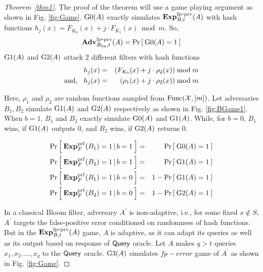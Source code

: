 \begin{proof}[Theorem~\ref{thm1}]
The proof of the theorem will use a game playing argument as shown in Fig. \ref{fig:Game}. $\text{G0}(A)$ exactly simulates $\mathrm{\mathbf{Exp}}^{\mathrm{fp\mbox{-}prv}}_{B,t}(A)$ with hash functions $h_j(x) =  F_{K_0}(x) + j\cdot F_{K_1}(x) \bmod m$. So,
\begin{equation}
\mathrm{\mathbf{Adv}}^{\mathrm{fp\mbox{-}prv}}_{B_{\mathrm{lin}},t}(A) = \Pr\left[\: \text{G0}(A)=1 \:\right]\label{eq:0}
\end{equation}
 $\text{G1}(A)$ and $\text{G2}(A)$ attack 2 different filters with hash functions 
\begin{eqnarray*}
h_j(x) &=& ( F_{K_0}(x) + j\cdot \rho_2(x)) \bmod m\\
\mathrm{and,}\hspace*{2ex} h_j(x) &=& ( \rho_1(x) + j \cdot \rho_2(x)) \bmod m 
\end{eqnarray*}

Here, $\rho_1$ and $\rho_2$ are random functions sampled from $\mathrm{Func}({\cal X},[m])$. Let adversaries $B_1, B_2$ simulate $\text{G1}(A)$ and $\text{G2}(A)$ respectively as shown in Fig. \ref{fig:BGame1}. When $b=1$, $B_1$ and $B_2$ exactly simulate $\text{G0}(A)$
and $\text{G1}(A)$. While, for $b=0$, $B_1$ wins, if $\text{G1}(A)$ outputs 0, and  $B_2$ wins, if $\text{G2}(A)$ returns 0.

\begin{eqnarray}
\Pr\left[\: \mathbf{Exp}^{\mathrm{prf}}_{F}(B_1) = 1\,|\,b=1 \:\right] &=& \Pr\left[\: \text{G0}(A)=1 \:\right]\label{eq:m1}\\
\Pr\left[\: \mathbf{Exp}^{\mathrm{prf}}_{F}(B_2) = 1\,|\,b=1 \:\right] &=& \Pr\left[\: \text{G1}(A)=1 \:\right]\label{eq:m2}\\
\Pr\left[\: \mathbf{Exp}^{\mathrm{prf}}_{F}(B_1) = 1\,|\,b=0 \:\right] &=& 1-\Pr\left[\: \text{G1}(A)=1 \:\right]\label{eq:m3}\\
\Pr\left[\: \mathbf{Exp}^{\mathrm{prf}}_{F}(B_2) = 1\,|\,b=0 \:\right] &=& 1-\Pr\left[\: \text{G2}(A)=1 \:\right]\label{eq:m4}
\end{eqnarray}

\par{In a classical Bloom filter, adversary $A^{'}$ is non-adaptive, i.e., for some fixed $x \notin S$, $A^{'}$ targets the false-positive error conditioned on randomness of hash functions. But in the $\mathrm{\mathbf{Exp}}^{\mathrm{fp\mbox{-}prv}}_{B,t}(A)$ game, $A$ is adaptive, as it can adapt its queries as well as its output based on response of $\mathsf{Query}$ oracle. Let $A$ makes $q>t$ queries $x_1, x_2, ..., x_q$ to the $\mathsf{Query}$ oracle. $\text{G3}(A)$ simulates $fp-error$ game of $A^{'}$ as shown in Fig. \ref{fig:Game}.}


\end{proof}
